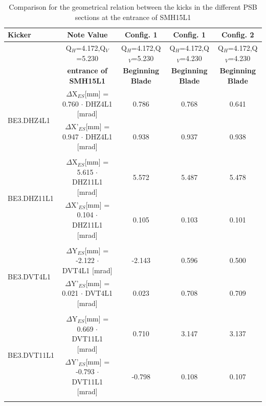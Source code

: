 \documentclass[11pt,letter,english]{article}
\begin{document}
\begin{table}

  \caption{
    Comparison for the geometrical relation between the kicks in the different PSB sections at the entrance of SMH15L1
    }

  \label{tab:geom_rel}

  \begin{tabular}{ |l|c|c|c|c| }\hline
  Kicker & Note Value               & Config. 1                & Config. 1                & Config. 2               \\ \hline
         & Q$_H$=4.172,Q$_V$=5.230  & Q$_H$=4.172,Q$_V$=5.230  & Q$_H$=4.172,Q$_V$=4.230  & Q$_H$=4.172,Q$_V$=4.230 \\ \hline
         & {\bf entrance of SMH15L1}             & {\bf Beginning Blade}                 & {\bf Beginning Blade}                 & {\bf Beginning Blade}                 \\ \hline

  \multirow{2}{*}{BE3.DHZ4L1} & $\Delta$X$_{ES}$[mm]  = 0.760 $\cdot$ DHZ4L1 [mrad] & 0.786 & 0.768 & 0.641 \\  \cline{2-5}
                              & $\Delta$X'$_{ES}$[mm] = 0.947 $\cdot$ DHZ4L1 [mrad] & 0.938 & 0.937 & 0.938 \\  \hline      
  \multicolumn{5}{|c|}{}        \\ \hline

  \multirow{2}{*}{BE3.DHZ11L1} & $\Delta$X$_{ES}$[mm]  = 5.615 $\cdot$ DHZ11L1 [mrad] & 5.572 & 5.487 & 5.478 \\ \cline{2-5} 
                               & $\Delta$X'$_{ES}$[mm] = 0.104 $\cdot$ DHZ11L1 [mrad] & 0.105 & 0.103 & 0.101 \\ \hline      
 \multicolumn{5}{|c|}{} \\ \hline

 \multirow{2}{*}{BE3.DVT4L1} & $\Delta$Y$_{ES}$[mm]  = -2.122 $\cdot$ DVT4L1 [mrad] & -2.143 & 0.596 & 0.500 \\  \cline{2-5}  
                             & $\Delta$Y'$_{ES}$[mm] =  0.021 $\cdot$ DVT4L1 [mrad] &  0.023 & 0.708 & 0.709 \\  \hline       
 \multicolumn{5}{|c|}{} \\ \hline

 \multirow{2}{*}{BE3.DVT11L1} & $\Delta$Y$_{ES}$[mm]  =  0.669 $\cdot$ DVT11L1 [mrad] &  0.710 & 3.147 & 3.137 \\ \cline{2-5}  
                              & $\Delta$Y'$_{ES}$[mm] = -0.793 $\cdot$ DVT11L1 [mrad] & -0.798 & 0.108 & 0.107 \\ \hline       
 \multicolumn{5}{|c|}{} \\ \hline

\end{tabular}
\end{table}
\end{document}
